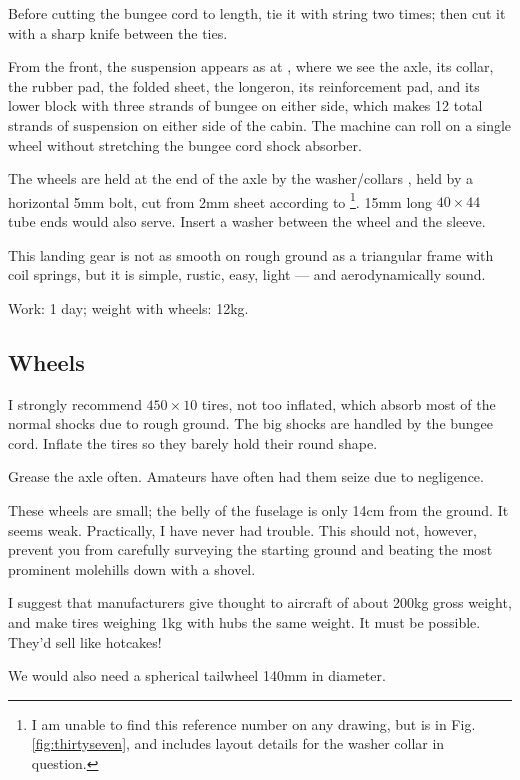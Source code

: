 \documentclass{book}
\newcommand*\circled[1]{\tikz[baseline=(char.base)]{
    \node[shape=circle,draw,inner sep=0.15pt] (char) {\footnotesize#1};}}
\begin{document}
Before cutting the bungee cord to length, tie it with string two
times; then cut it with a sharp knife between the ties.

From the front, the suspension appears as at \circled{160}, where we
see the axle, its collar, the rubber pad, the folded sheet, the
longeron, its reinforcement pad, and its lower block with three
strands of bungee on either side, which makes 12 total strands of
suspension on either side of the cabin.  The machine can roll on a
single wheel without stretching the bungee cord shock absorber.

The wheels are held at the end of the axle by the washer/collars
\circled{161}, held by a horizontal 5mm bolt, cut from 2mm sheet
according to \circled{162}\footnote{I am unable to find this reference
  number on any drawing, but \circled{161} is in
  Fig. \ref{fig:thirtyseven}, and includes layout details for the
  washer collar in question.}.  15mm long $40\times44$ tube ends would
also serve.  Insert a washer between the wheel and the sleeve.

This landing gear is not as smooth on rough ground as a triangular
frame with coil springs, but it is simple, rustic, easy, light --- and
aerodynamically sound.

Work: 1 day; weight with wheels: 12kg.

\subsection{Wheels}

I strongly recommend $450\times10$ tires, not too inflated, which
absorb most of the normal shocks due to rough ground.  The big shocks
are handled by the bungee cord.  Inflate the tires so they barely hold
their round shape.

Grease the axle often.  Amateurs have often had them seize due to
negligence.

These wheels are small; the belly of the fuselage is only 14cm from
the ground.  It seems weak.  Practically, I have never had trouble.
This should not, however, prevent you from carefully surveying the
starting ground and beating the most prominent molehills down with a
shovel.

I suggest that manufacturers give thought to aircraft of about 200kg
gross weight, and make tires weighing 1kg with hubs the same weight.
It must be possible.  They'd sell like hotcakes!

We would also need a spherical tailwheel 140mm in diameter.
\end{document}
